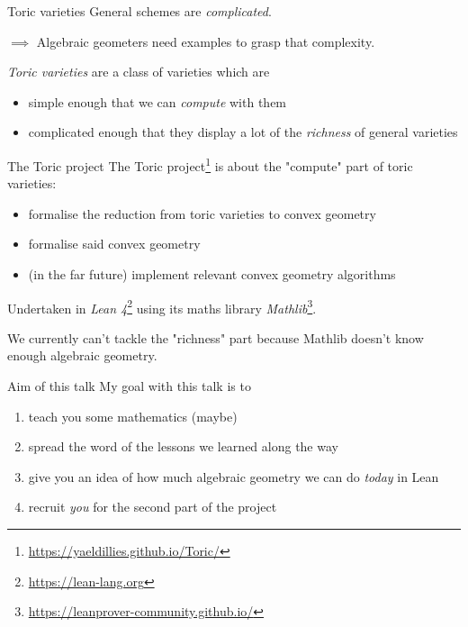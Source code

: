 \documentclass[10pt, handout]{beamer}
\begin{document}
\begin{frame}{Toric varieties}
    General schemes are \emph{complicated}.

    $\implies$ Algebraic geometers need \alert{examples} to grasp that complexity.

    \pause

    \emph{Toric varieties} are a class of varieties which are
    \begin{itemize}
        \item simple enough that we can \emph{compute} with them
        \item complicated enough that they display a lot of the \emph{richness} of general varieties
    \end{itemize}
\end{frame}


\begin{frame}{The Toric project}
    The \alert{Toric} project\footnote{\url{https://yaeldillies.github.io/Toric/}} is about the "compute" part of toric varieties:
    \begin{itemize}
        \item formalise the reduction from toric varieties to convex geometry
        \item formalise said convex geometry
        \item (in the far future) implement relevant convex geometry algorithms
    \end{itemize}

    Undertaken in \emph{Lean 4}\footnote{\url{https://lean-lang.org}} using its maths library \emph{Mathlib}\footnote{\url{https://leanprover-community.github.io/}}.

    \pause

    We currently can't tackle the "richness" part because Mathlib doesn't know enough algebraic geometry.
\end{frame}


\begin{frame}{Aim of this talk}
    My goal with this talk is to
    \begin{enumerate}
        \item teach you some mathematics (maybe)
        \item spread the word of the lessons we learned along the way
        \item give you an idea of how much algebraic geometry we can do \emph{today} in Lean
        \item recruit \emph{you} for the second part of the project
    \end{enumerate}
\end{frame}
\end{document}
